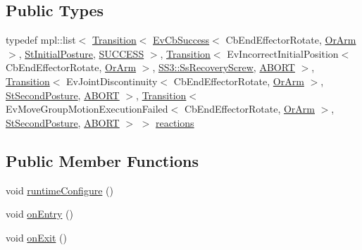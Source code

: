 \subsection*{Public Types}
\begin{DoxyCompactItemize}
\item 
typedef mpl\+::list$<$ \hyperlink{classsmacc_1_1Transition}{Transition}$<$ \hyperlink{structsmacc_1_1EvCbSuccess}{Ev\+Cb\+Success}$<$ Cb\+End\+Effector\+Rotate, \hyperlink{classsm__moveit__screw__loop_1_1OrArm}{Or\+Arm} $>$, \hyperlink{structsm__moveit__screw__loop_1_1StInitialPosture}{St\+Initial\+Posture}, \hyperlink{structsmacc_1_1default__transition__tags_1_1SUCCESS}{S\+U\+C\+C\+E\+SS} $>$, \hyperlink{classsmacc_1_1Transition}{Transition}$<$ Ev\+Incorrect\+Initial\+Position$<$ Cb\+End\+Effector\+Rotate, \hyperlink{classsm__moveit__screw__loop_1_1OrArm}{Or\+Arm} $>$, \hyperlink{structsm__moveit__screw__loop_1_1SS3_1_1SsRecoveryScrew}{S\+S3\+::\+Ss\+Recovery\+Screw}, \hyperlink{structsmacc_1_1default__transition__tags_1_1ABORT}{A\+B\+O\+RT} $>$, \hyperlink{classsmacc_1_1Transition}{Transition}$<$ Ev\+Joint\+Discontinuity$<$ Cb\+End\+Effector\+Rotate, \hyperlink{classsm__moveit__screw__loop_1_1OrArm}{Or\+Arm} $>$, \hyperlink{structsm__moveit__screw__loop_1_1StSecondPosture}{St\+Second\+Posture}, \hyperlink{structsmacc_1_1default__transition__tags_1_1ABORT}{A\+B\+O\+RT} $>$, \hyperlink{classsmacc_1_1Transition}{Transition}$<$ Ev\+Move\+Group\+Motion\+Execution\+Failed$<$ Cb\+End\+Effector\+Rotate, \hyperlink{classsm__moveit__screw__loop_1_1OrArm}{Or\+Arm} $>$, \hyperlink{structsm__moveit__screw__loop_1_1StSecondPosture}{St\+Second\+Posture}, \hyperlink{structsmacc_1_1default__transition__tags_1_1ABORT}{A\+B\+O\+RT} $>$ $>$ \hyperlink{structsm__moveit__screw__loop_1_1StSecondPosture_abe50ca14852e84d2f241dde5511bf280}{reactions}
\end{DoxyCompactItemize}
\subsection*{Public Member Functions}
\begin{DoxyCompactItemize}
\item 
void \hyperlink{structsm__moveit__screw__loop_1_1StSecondPosture_af6a1ca0635f3000eeaf9302a9aca1efa}{runtime\+Configure} ()
\item 
void \hyperlink{structsm__moveit__screw__loop_1_1StSecondPosture_aa8f8702818aff4bba59cd992165b0d0e}{on\+Entry} ()
\item 
void \hyperlink{structsm__moveit__screw__loop_1_1StSecondPosture_a19240afdfde0f7e7a99a40fef6a76b01}{on\+Exit} ()
\end{DoxyCompactItemize}
